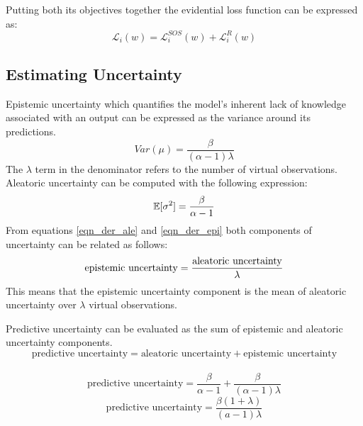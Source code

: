 	Putting both its objectives together the evidential loss function can be expressed as:
	\begin{equation}
		\mathcal{L}_i(w) = \mathcal{L}_i^{SOS}(w) + \mathcal{L}_{i}^R(w)
	\end{equation}
	
	\subsection{Estimating Uncertainty}
	Epistemic uncertainty which quantifies the model's inherent lack of knowledge associated with an output can be expressed as the variance around its predictions.
	\begin{equation}\label{eqn_der_epi}
		Var(\mu) = \frac{\beta}{(\alpha - 1)\lambda}
	\end{equation}
	The $\lambda$ term in the denominator refers to the number of virtual observations.
	Aleatoric uncertainty can be computed with the following expression:
	\begin{equation}\label{eqn_der_ale}
		\centering
		\mathbb{E}[\sigma^2]=\frac{\beta}{\alpha -1}
	\end{equation}
	From equations \ref{eqn_der_ale} and \ref{eqn_der_epi} both components of uncertainty can be related as follows:
	\begin{equation}
		\centering
		\text{epistemic uncertainty} = \frac{\text{aleatoric uncertainty}}{\lambda}
	\end{equation}
	This means that the epistemic uncertainty component is the mean of aleatoric uncertainty over $\lambda$ virtual observations.
	
	Predictive uncertainty can be evaluated as the sum of epistemic and aleatoric uncertainty components.
	\begin{equation}
		\text{predictive uncertainty}= \text{aleatoric uncertainty} + \text{epistemic uncertainty}
	\end{equation}
	\\
	\begin{equation}
		\text{predictive uncertainty}= \frac{\beta}{\alpha -1} + \frac{\beta}{(\alpha - 1)\lambda}
	\end{equation}
	\begin{equation}
		\text{predictive uncertainty} = \frac{\beta(1+\lambda)}{(a-1)\lambda}
	\end{equation}

